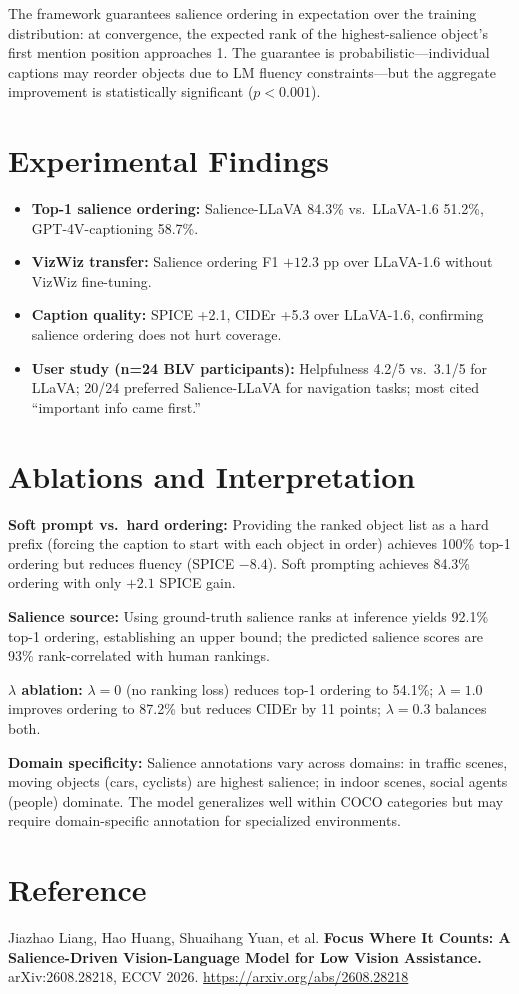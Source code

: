 \documentclass[10pt,twocolumn]{article}
\begin{document}
The framework guarantees salience ordering in expectation over the
training distribution: at convergence, the expected rank of the
highest-salience object's first mention position approaches 1.
The guarantee is probabilistic—individual captions may reorder objects
due to LM fluency constraints—but the aggregate improvement is
statistically significant ($p < 0.001$).

\section{Experimental Findings}

\begin{itemize}[itemsep=2pt,parsep=0pt]
  \item \textbf{Top-1 salience ordering:} Salience-LLaVA 84.3\% vs.\
    LLaVA-1.6 51.2\%, GPT-4V-captioning 58.7\%.
  \item \textbf{VizWiz transfer:} Salience ordering F1 $+12.3$ pp over
    LLaVA-1.6 without VizWiz fine-tuning.
  \item \textbf{Caption quality:} SPICE +2.1, CIDEr +5.3 over LLaVA-1.6,
    confirming salience ordering does not hurt coverage.
  \item \textbf{User study (n=24 BLV participants):} Helpfulness
    4.2/5 vs.\ 3.1/5 for LLaVA; 20/24 preferred Salience-LLaVA for
    navigation tasks; most cited ``important info came first.''
\end{itemize}

\section{Ablations and Interpretation}

\textbf{Soft prompt vs.\ hard ordering:} Providing the ranked object list
as a hard prefix (forcing the caption to start with each object in order)
achieves 100\% top-1 ordering but reduces fluency (SPICE $-8.4$). Soft
prompting achieves 84.3\% ordering with only $+2.1$ SPICE gain.

\textbf{Salience source:} Using ground-truth salience ranks at inference
yields 92.1\% top-1 ordering, establishing an upper bound; the predicted
salience scores are 93\% rank-correlated with human rankings.

\textbf{$\lambda$ ablation:} $\lambda = 0$ (no ranking loss) reduces
top-1 ordering to 54.1\%; $\lambda = 1.0$ improves ordering to 87.2\%
but reduces CIDEr by 11 points; $\lambda = 0.3$ balances both.

\textbf{Domain specificity:} Salience annotations vary across domains:
in traffic scenes, moving objects (cars, cyclists) are highest salience;
in indoor scenes, social agents (people) dominate. The model generalizes
well within COCO categories but may require domain-specific annotation
for specialized environments.

\section*{Reference}

Jiazhao Liang, Hao Huang, Shuaihang Yuan, et al.
\textbf{Focus Where It Counts: A Salience-Driven Vision-Language
Model for Low Vision Assistance.}
arXiv:2608.28218, ECCV 2026.
\url{https://arxiv.org/abs/2608.28218}
\end{document}
